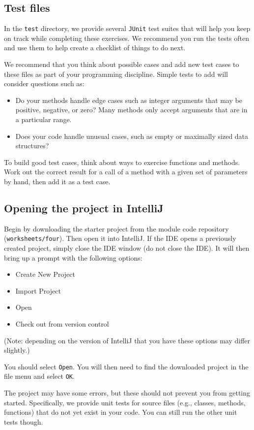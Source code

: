 \documentclass[12pt,a4paper]{exam}
\begin{document}
\subsection*{Test files}

In the \texttt{test} directory, we provide several \verb!JUnit! test suites that will 
help you keep on track while completing these exercises. 
We recommend you run the tests often and use them to help create a checklist of things to do next.

We recommend that you think about possible cases and add new test cases to these 
files as part of your programming discipline. Simple tests to add will consider questions such as:
\begin{itemize}
	\item Do your methods handle edge cases such as integer arguments that may be positive, 
	negative, or zero? Many methods only accept arguments that are in a particular range.
	\item Does your code handle unusual cases, such as empty or maximally sized data structures?	
\end{itemize}
To build good test cases, think about ways to exercise functions and methods. 
Work out the correct result for a call of a method with a given set of parameters by hand, 
then add it as a test case.

\subsection*{Opening the project in IntelliJ}

Begin by downloading the starter project from the module code repository (\verb!worksheets/four!).
Then open it into IntelliJ. 
If the IDE opens a previously created project, simply close the IDE window (do not close the IDE). 
It will then bring up a prompt with the following options:
\begin{itemize}
	\item Create New Project
	\item Import Project
	\item Open
	\item Check out from version control	
\end{itemize}
(Note: depending on the version of IntelliJ that you have these options may differ slightly.)

You should select \verb!Open!. You will then need to find the downloaded project in the file menu 
and select \verb!OK!. 

The project may have some errors, but these should not prevent you from getting started. 
Specifically, we provide unit tests for source files (e.g., classes, methods, functions) 
that do not yet exist in your code. You can still run the other unit tests though.
\end{document}
